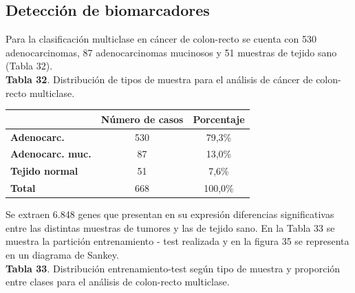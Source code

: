 \subsection{Detección de biomarcadores}

Para la clasificación multiclase en cáncer de colon-recto se cuenta con 530 adenocarcinomas, 87 adenocarcinomas mucinosos y 51 muestras de tejido sano (Tabla 32).\\

\textbf{Tabla 32}. Distribución de tipos de muestra para el análisis de cáncer de colon-recto multiclase.

\begin{table}[H]
	\centering
	\begin{tabular}{lcc}
		\cline{2-3}
		& \textbf{Número de casos} & \textbf{Porcentaje} \\ \hline
		\textbf{Adenocarc.}          & 530 & 79,3\%  \\
		\textbf{Adenocarc. muc.} & 87  & 13,0\%  \\
		\textbf{Tejido normal}           & 51  & 7,6\%   \\ \hline
		\textbf{Total}                   & 668 & 100,0\%
	\end{tabular}
\end{table}

Se extraen 6.848 genes que presentan en su expresión diferencias significativas entre las distintas muestras de tumores y las de tejido sano. En la Tabla 33 se muestra la partición entrenamiento - test realizada y en la figura 35 se representa en un diagrama de Sankey.\\

\textbf{Tabla 33}. Distribución entrenamiento-test según tipo de muestra y proporción entre clases para el análisis de colon-recto multiclase.


